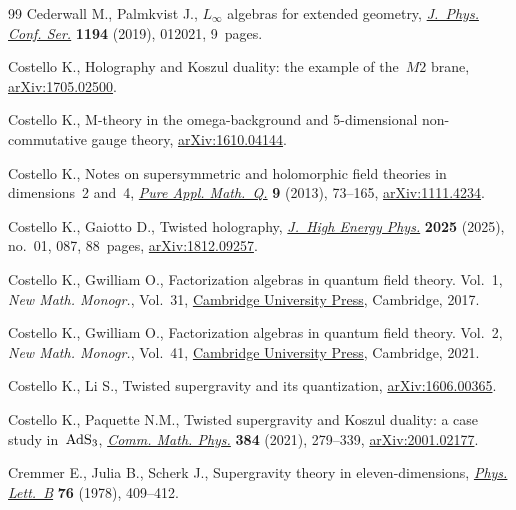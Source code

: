 \documentclass[pdftex]{sigma}
\numberwithin{equation}{section}
\theoremstyle{definition}
\begin{document}
\begin{thebibliography}{99}
Cederwall M., Palmkvist J., {$L_\infty$} algebras for extended geometry,
 \href{https://doi.org/10.1088/1742-6596/1194/1/012021}{\textit{J.~Phys. Conf.
 Ser.}} \textbf{1194} (2019), 012021, 9~pages.

Costello K., Holography and Koszul duality: the example of the~$M2$ brane,
 \href{http://arxiv.org/abs/1705.02500}{arXiv:1705.02500}.

Costello K., M-theory in the omega-background and 5-dimensional non-commutative
 gauge theory, \href{http://arxiv.org/abs/1610.04144}{arXiv:1610.04144}.

Costello K., Notes on supersymmetric and holomorphic field theories in
 dimensions~2 and~4,
 \href{https://doi.org/10.4310/PAMQ.2013.v9.n1.a3}{\textit{Pure Appl.
 Math.~Q.}} \textbf{9} (2013), 73--165,
 \href{http://arxiv.org/abs/1111.4234}{arXiv:1111.4234}.

Costello K., Gaiotto D., Twisted holography,
 \href{https://doi.org/10.1007/JHEP01(2025)087}{\textit{J.~High Energy Phys.}}
 \textbf{2025} (2025), no.~01, 087, 88~pages,
 \href{http://arxiv.org/abs/1812.09257}{arXiv:1812.09257}.

Costello K., Gwilliam O., Factorization algebras in quantum field theory.
 {V}ol.~1, \textit{New Math. Monogr.}, Vol.~31,
 \href{https://doi.org/10.1017/9781316678626}{Cambridge University Press},
 Cambridge, 2017.

Costello K., Gwilliam O., Factorization algebras in quantum field theory.
 {V}ol.~2, \textit{New Math. Monogr.}, Vol.~41,
 \href{https://doi.org/10.1017/9781316678664}{Cambridge University Press},
 Cambridge, 2021.

Costello K., Li S., Twisted supergravity and its quantization,
 \href{http://arxiv.org/abs/1606.00365}{arXiv:1606.00365}.

Costello K., Paquette N.M., Twisted supergravity and {K}oszul duality: a case
 study in~{$\rm AdS_3$},
 \href{https://doi.org/10.1007/s00220-021-04065-3}{\textit{Comm. Math. Phys.}}
 \textbf{384} (2021), 279--339,
 \href{http://arxiv.org/abs/2001.02177}{arXiv:2001.02177}.

Cremmer E., Julia B., Scherk J., Supergravity theory in eleven-dimensions,
 \href{https://doi.org/10.1016/0370-2693(78)90894-8}{\textit{Phys. Lett.~B}}
 \textbf{76} (1978), 409--412.


\end{thebibliography}
\end{document}
